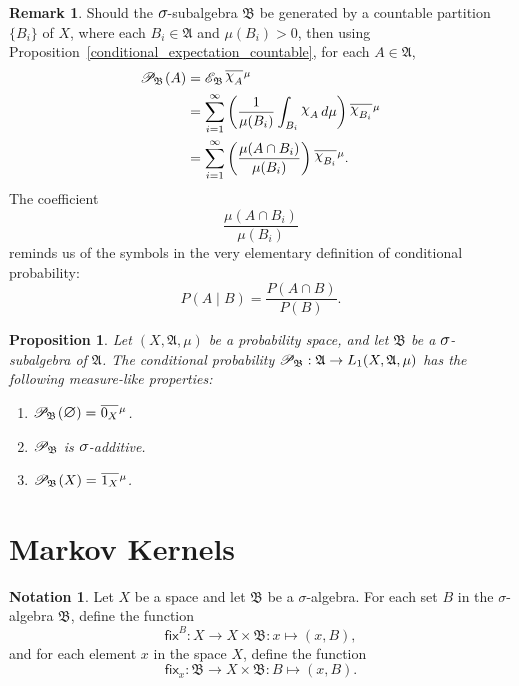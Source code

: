 \documentclass[
twoside=true,
paper=letter,
fontsize=9pt,
pagesize=auto,
leqno,
openany,
headsepline,
overfullrule,
]{scrbook}
\theoremstyle{plain}
\theoremstyle{plain}
\newtheorem{prop}[thm]{Proposition}
\theoremstyle{definition}
\newtheorem{rmk}[thm]{Remark}
\newtheorem{notn}[thm]{Notation}
\theoremstyle{bfnoteitalic}
\theoremstyle{bfnoteroman}
\newcommand{\sigalg}[1]{\mathfrak{#1}}
\newcommand{\cali}[1]{\mathscr{#1}}
\newcommand{\sfop}[1]{\mathsf{#1}}
\newcommand{\condexpsub}[2]
{\mathop{\cali{E}\hspace{-1.5pt}}\nolimits_{#2}\hspace{-1pt}#1}
\newcommand{\condprobsub}[2]
{\mathop{\cali{P}\hspace{-1.5pt}}\nolimits_{#2}\hspace{-1pt}\left(#1\right)}
\newcommand{\condprobop}[1]{\mathop{\cali{P}\hspace{-1pt}}\nolimits_{#1}}
\newcommand{\textsigma}{\hbox{\large{$\sigma$}}\kern-1pt}
\newcommand{\charfunction}[1]{{\raisebox{2pt}{$\chi$}}_{#1}}
\newcommand{\mtset}{\hbox{\large{$\varnothing$}}}
\newcommand{\meets}{\cap}
\newcommand{\sigmaalgebra}{\sigalg{A}}
\newcommand{\sigmaalgebraii}{\sigalg{B}}
\newcommand{\Lone}{L_1(\measurespace, \sigmaalgebra, \measure)}
\newcommand{\sigalgb}{\sigmaalgebraii}
\newcommand{\measurespace}{X}
\newcommand{\mspaceelt}{x}
\newcommand{\measure}{\mu}
\newcommand{\seti}{A}
\newcommand{\setii}{B}
\newcommand{\fixinthefirst}[1]{\sfop{fix}_{#1}}
\newcommand{\fixinthesecond}[1]{\sfop{fix}^{#1}}
\newcommand*\xbar[1]{%
   \hbox{%
     \vbox{%
       \hrule height 0.4pt %
       \kern0.4ex%
       \hbox{%
         \ensuremath{#1}%
       }%
     }%
   }%
}
\newcommand{\lebclass}[1]{\hspace{.5pt}\xbar{#1}\hspace{0.5pt}}
\newcommand{\ellclass}[2]{\lebclass{#1}^{#2}}
\begin{document}
\begin{rmk}
Should the $\textsigma$-subalgebra $\sigmaalgebraii$ be generated by a countable partition $\{\setii_i\}$ of $\measurespace$, where each $\setii_i\in\sigmaalgebra$ and $\measure(\setii_i)>0$, then using Proposition~\ref{conditional_expectation_countable}, for each 
$\seti\in\sigmaalgebra$,
\begin{align*}
\condprobsub{\seti}{\sigalgb}
& = \condexpsub{\ellclass{\charfunction{\seti}}{\measure}}{\sigmaalgebraii} \\
& =
\sum_{i=1}^{\infty}
\left(
\frac{1}{\measure(\setii_i)}
\int_{\setii_i} \charfunction{\seti}\, d\measure
\right)
\ellclass{\charfunction{\setii_i}}{\measure} \\
& = 
\sum_{i=1}^{\infty}
\left(
\frac{\measure(\seti \meets \setii_i)}{\measure(\setii_i)}
\right)
\ellclass{\charfunction{\setii_i}}{\measure}.
\end{align*}
The coefficient
\[
\dfrac{\measure(\seti \meets \setii_i)}{\measure(\setii_i)}
\]
reminds us of the symbols in the very elementary definition of conditional probability:
\[
P(A\mid B) = \frac{P(A\meets B)}{P(B)}.
\]
\end{rmk}



\begin{prop}
Let
$(\measurespace,\sigmaalgebra,\measure)$
be a probability space, and let $\sigmaalgebraii$ be a $\textsigma$-subalgebra of $\sigmaalgebra$.
The conditional probability $\condprobop{\sigmaalgebraii}: \sigmaalgebra \to \Lone$  
has the following measure-like properties:
\begin{enumerate}
\item 
$\condprobsub{\mtset}{\sigmaalgebraii} = \ellclass{0_\measurespace}{\measure}$.
\item
$\condprobop{\sigmaalgebraii}$ is $\textsigma$-additive.
\item
$\condprobsub{\measurespace}{\sigmaalgebraii} = \ellclass{1_\measurespace}{\measure}$.
\end{enumerate}
\end{prop}




\section{Markov Kernels}
\begin{notn}
Let 
$\measurespace$ be a space and let
$\sigmaalgebraii$ be a \textsigma-algebra.
For each set $\setii$ in the \textsigma-algebra $\sigmaalgebraii$, define the function
\[
\fixinthesecond{\setii}
: \measurespace\to\measurespace\times\sigmaalgebraii
: \mspaceelt\mapsto(\mspaceelt,\setii),
\]
 and for each  element $\mspaceelt$ in the space $\measurespace$, define the function
\[
\fixinthefirst{\mspaceelt}
: \sigmaalgebraii\to\measurespace\times\sigmaalgebraii
: \setii\mapsto(\mspaceelt,\setii).
\]
\end{notn}
\end{document}

